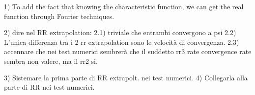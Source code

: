 


1) To add the fact that knowing the characteristic function, we can get the real function through Fourier techniques. 

2) dire nel RR extrapolation:
2.1) triviale che entrambi convergono a psi
2.2) L'unica differenza tra i 2 rr extrapolation sono le velocità di convergenza.
2.3) accennare che nei test numerici sembrerà che il suddetto rr3 rate convergence rate sembra non valere, ma il rr2 si.

3) Sistemare la prima parte di RR extrapolt. nei test numerici.
4) Collegarla alla parte di RR nei test numerici.
